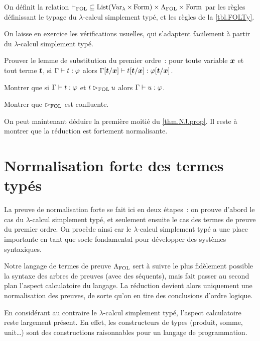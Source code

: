 \begin{definition}
  On définit la relation
  $\mathord{\vdash_{\mathrm{FOL}}}\subseteq \operatorname{List}(\operatorname{Var}_{\lambda}\times\operatorname{Form})
  \times\Lambda_{\mathrm{FOL}}\times\operatorname{Form}$
  par les règles définissant le typage du $\lambda$-calcul simplement typé,
  et les règles de la \cref{tbl.FOLTy}.
\end{definition}

On laisse en exercice les vérifications usuelles, qui s'adaptent facilement
à partir du $\lambda$-calcul simplement typé.

\begin{exercise}
  Prouver le lemme de substitution du premier ordre~: pour toute variable
  $\bm{x}$ et tout terme $\bm{t}$, si $\Gamma\mathrel{\vdash} t : \varphi$ alors
  $\Gamma[\bm{t}/\bm{x}]\mathrel{\vdash} t[\bm{t}/\bm{x}] : \varphi[\bm{t}/\bm{x}]$.
\end{exercise}

\begin{exercise}
  Montrer que si $\Gamma\mathrel{\vdash} t : \varphi$ et $t \rhd_{\mathrm{FOL}} u$ alors
  $\Gamma\mathrel{\vdash} u : \varphi$.
\end{exercise}

\begin{exercise}
  Montrer que $\rhd_{\mathrm{FOL}}$ est confluente.
\end{exercise}

On peut maintenant déduire la première moitié du \cref{thm.NJ.prop}. Il reste
à montrer que la réduction est fortement normalisante.

\section{Normalisation forte des termes typés}

La preuve de normalisation forte se fait ici en deux étapes~: on prouve d'abord
le cas du $\lambda$-calcul simplement typé, et seulement ensuite le cas des
termes de preuve du premier ordre. On procède ainsi car le $\lambda$-calcul
simplement typé a une place importante en tant que socle fondamental pour
développer des systèmes syntaxiques.

Notre langage de termes de preuve $\Lambda_{\mathrm{FOL}}$ sert à suivre le plus fidèlement
possible la syntaxe des arbres de preuves (avec des séquents), mais fait passer
au second plan l'aspect calculatoire du langage. La réduction devient alors
uniquement une normalisation des preuves, de sorte qu'on en tire des conclusions
d'ordre logique.

En considérant au contraire le $\lambda$-calcul simplement typé, l'aspect
calculatoire reste largement présent. En effet, les constructeurs de types
(produit, somme, unit\ldots) sont des constructions raisonnables pour un
langage de programmation.


